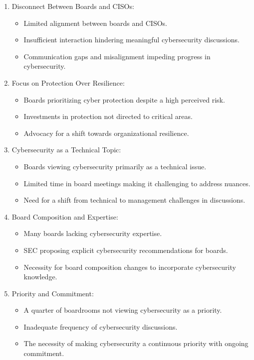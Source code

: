 \documentclass{article}
\begin{document}
\begin{enumerate}
\item Disconnect Between Boards and CISOs:
     \begin{itemize}
        \item Limited alignment between boards and CISOs.
        \item Insufficient interaction hindering meaningful cybersecurity discussions.
        \item Communication gaps and misalignment impeding progress in cybersecurity.
     \end{itemize}
 
\item Focus on Protection Over Resilience:
     \begin{itemize}
        \item Boards prioritizing cyber protection despite a high perceived risk.
        \item Investments in protection not directed to critical areas.
        \item Advocacy for a shift towards organizational resilience.
     \end{itemize}
 
\item Cybersecurity as a Technical Topic:
     \begin{itemize}
        \item Boards viewing cybersecurity primarily as a technical issue.
        \item Limited time in board meetings making it challenging to address nuances.
        \item Need for a shift from technical to management challenges in discussions.
     \end{itemize}
 
\item Board Composition and Expertise:
     \begin{itemize}
        \item Many boards lacking cybersecurity expertise.
        \item SEC proposing explicit cybersecurity recommendations for boards.
        \item Necessity for board composition changes to incorporate cybersecurity knowledge.
     \end{itemize}
 
\item Priority and Commitment:
     \begin{itemize}
        \item A quarter of boardrooms not viewing cybersecurity as a priority.
        \item Inadequate frequency of cybersecurity discussions.
        \item The necessity of making cybersecurity a continuous priority with ongoing commitment.
     \end{itemize}
\end{enumerate}
\end{document}
